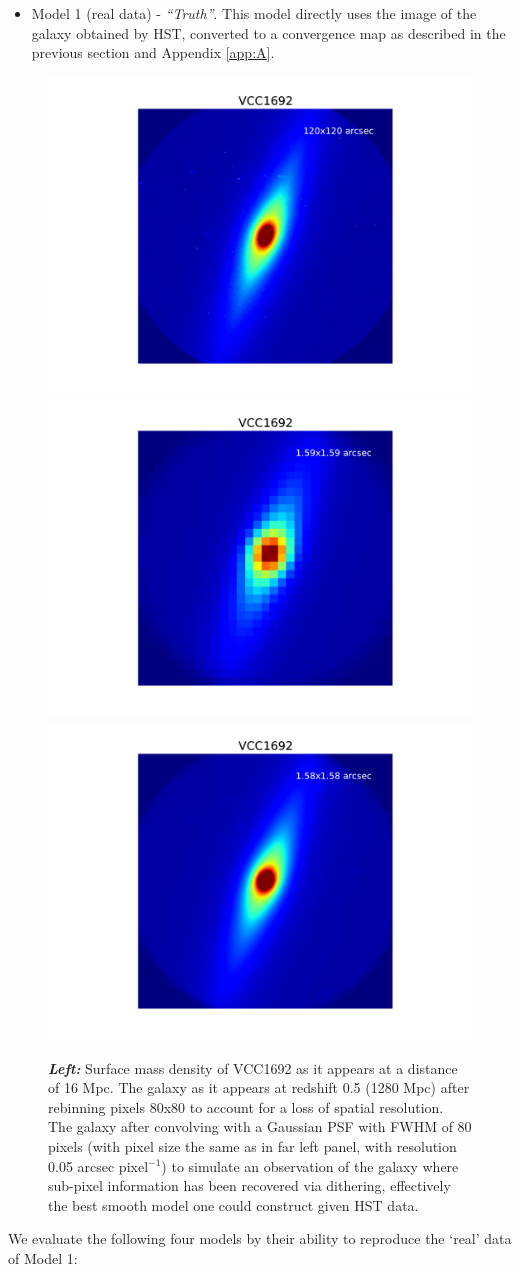 \begin{itemize}
	\item Model 1 (real data) - \textit{``Truth''}. This model directly uses the image of the galaxy obtained by HST, converted to a convergence map as described in the previous section and Appendix \ref{app:A}. 
\end{itemize}
\begin{figure}
	\includegraphics[clip,trim=4.1cm 1.5cm 4.1cm 2cm,width=.325\textwidth]{./figures_sls/baryonmap_truth-eps-converted-to.pdf}
	\includegraphics[clip,trim=4.1cm 1.5cm 4.1cm 2cm,width=.325\textwidth]{./figures_sls/baryonmap_RealHST-eps-converted-to.pdf}
	\includegraphics[clip,trim=4.1cm 1.5cm 4.1cm 2cm,width=.325\textwidth]{./figures_sls/baryonmap_smoothed-eps-converted-to.pdf}
	\caption{\label{fig:VCC1692real_vs_mods}{\bf{\emph{Left:}}} Surface mass density of VCC1692 as it appears at a distance of 16 Mpc.  The galaxy as it appears at redshift 0.5 (1280 Mpc) after rebinning pixels 80x80 to account for a loss of spatial resolution.   The galaxy after convolving with a Gaussian PSF with FWHM of 80 pixels (with pixel size the same as in far left panel, with resolution 0.05 arcsec pixel$^{-1}$) to simulate an observation of the galaxy where sub-pixel information has been recovered via dithering, effectively the best smooth model one could construct given HST data.}
\end{figure}
\noindent We evaluate the following four models by their ability to reproduce the `real' data of Model 1:


